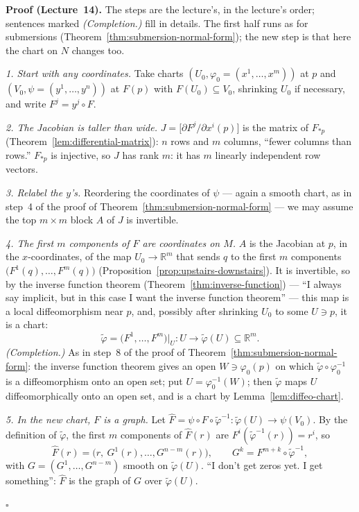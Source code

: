 \documentclass[11pt]{report}
\renewenvironment{proof}[1][Proof]{\noindent\textbf{#1.} }{\hfill$\square$\par\vspace{5pt}}
\begin{document}
\begin{proof}[Proof (Lecture~14)]
The steps are the lecture's, in the lecture's order; sentences marked \textit{(Completion.)} fill in details. The first half runs as for submersions (Theorem~\ref{thm:submersion-normal-form}); the new step is that here the chart on $N$ changes too.

\emph{1. Start with any coordinates.} Take charts $(U_0, \varphi_0 = (x^1, \ldots, x^m))$ at $p$ and $(V_0, \psi = (y^1, \ldots, y^n))$ at $F(p)$ with $F(U_0) \subseteq V_0$, shrinking $U_0$ if necessary, and write $F^j = y^j \circ F$.

\emph{2. The Jacobian is taller than wide.} $J = \big[\partial F^j/\partial x^i(p)\big]$ is the matrix of $F_{*p}$ (Theorem~\ref{lem:differential-matrix}): $n$ rows and $m$ columns, ``fewer columns than rows.'' $F_{*p}$ is injective, so $J$ has rank $m$: it has $m$ linearly independent row vectors.

\emph{3. Relabel the $y$'s.} Reordering the coordinates of $\psi$ --- again a smooth chart, as in step~4 of the proof of Theorem~\ref{thm:submersion-normal-form} --- we may assume the top $m \times m$ block $A$ of $J$ is invertible.

\emph{4. The first $m$ components of $F$ are coordinates on $M$.} $A$ is the Jacobian at $p$, in the $x$-coordinates, of the map $U_0 \to \mathbb{R}^m$ that sends $q$ to the first $m$ components $\big(F^1(q), \ldots, F^m(q)\big)$ (Proposition~\ref{prop:upstairs-downstairs}). It is invertible, so by the inverse function theorem (Theorem~\ref{thm:inverse-function}) --- ``I always say implicit, but in this case I want the inverse function theorem'' --- this map is a local diffeomorphism near $p$, and, possibly after shrinking $U_0$ to some $U \ni p$, it is a chart:
\[
\tilde\varphi = \big(F^1, \ldots, F^m\big)\big|_U : U \longrightarrow \tilde\varphi(U) \subseteq \mathbb{R}^m .
\]
\textit{(Completion.)} As in step~8 of the proof of Theorem~\ref{thm:submersion-normal-form}: the inverse function theorem gives an open $W \ni \varphi_0(p)$ on which $\tilde\varphi \circ \varphi_0^{-1}$ is a diffeomorphism onto an open set; put $U = \varphi_0^{-1}(W)$; then $\tilde\varphi$ maps $U$ diffeomorphically onto an open set, and is a chart by Lemma~\ref{lem:diffeo-chart}.

\emph{5. In the new chart, $F$ is a graph.} Let $\hat F = \psi \circ F \circ \tilde\varphi^{-1} : \tilde\varphi(U) \to \psi(V_0)$. By the definition of $\tilde\varphi$, the first $m$ components of $\hat F(r)$ are $F^i(\tilde\varphi^{-1}(r)) = r^i$, so
\[
\hat F(r) = \big(r, \ G^1(r), \ldots, G^{n-m}(r)\big), \qquad G^k = F^{m+k} \circ \tilde\varphi^{-1} ,
\]
with $G = (G^1, \ldots, G^{n-m})$ smooth on $\tilde\varphi(U)$. ``I don't get zeros yet. I get something'': $\hat F$ is the graph of $G$ over $\tilde\varphi(U)$.


\end{proof}
\end{document}
